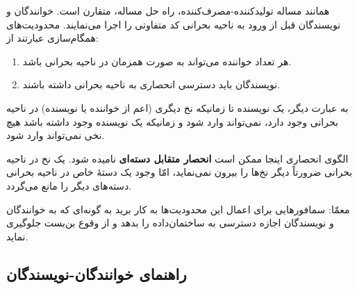 \documentclass{book}
\newcommand{\clearemptydoublepage}{\newpage\cleardoublepage}
\begin{document}
    همانند مساله تولیدکننده‌-مصرف‌کننده،‌ راه حل مساله، متقارن است. 
    خوانندگان و نویسندگان قبل از ورود به ناحیه بحرانی کد متفاوتی را اجرا می‌نمایند. محدودیت‌های همگام‌سازی عبارتند از: 

\begin{enumerate}

\item 
    هر تعداد خواننده می‌تواند به صورت همزمان در ناحیه بحرانی باشد. 

\item 
    نویسندگان باید دسترسی انحصاری به ناحیه بحرانی داشته باشند. 
\end{enumerate}

    به عبارت دیگر، یک نویسنده تا زمانیکه نخ دیگری (اعم از خواننده یا نویسنده) در ناحیه بحرانی وجود دارد، نمی‌تواند وارد شود و زمانیکه یک نویسنده 
    وجود داشته باشد هیچ نخی نمی‌تواند وارد شود. 

    الگوی انحصاری اینجا ممکن است \textbf{انحصار متقابل دسته‌ای} نامیده شود. 
    یک نخ در ناحیه بحرانی ضرورتاً دیگر نخ‌ها را بیرون نمی‌نماید، امّا وجود یک دستهٔ خاص در ناحیه بحرانی دسته‌های دیگر را مانع می‌گردد. 

    معمّا: سمافورهایی برای اعمال این محدودیت‌ها به کار برید به گونه‌ای که به خوانندگان و نویسندگان اجازه دسترسی به ساختمان‌داده را بدهد و 
    از  وقوع بن‌بست جلوگیری نماید. 


\clearemptydoublepage
\subsection{راهنمای خوانندگان-نویسندگان}
\end{document}
